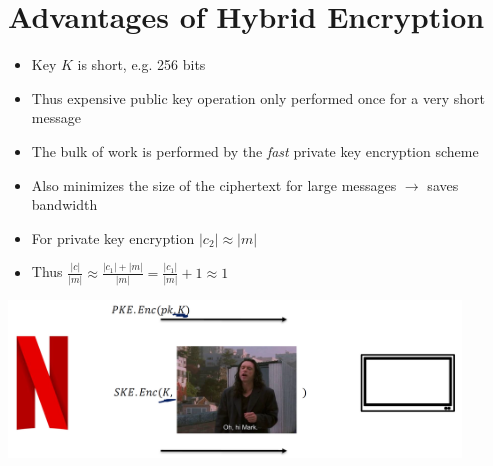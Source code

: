 \section{Advantages of Hybrid Encryption}
	\begin{itemize}
		\item Key $K$ is short, e.g. 256 bits
		\item Thus expensive public key operation only performed once for a very short message
		\item The bulk of work is performed by the \textit{fast} private key encryption scheme
		\item Also minimizes the size of the ciphertext for large messages $\rightarrow$ saves bandwidth
		\item For private key encryption $|c_2| \approx |m|$
		\item Thus $\frac{|c|}{|m|} \approx \frac{|c_1|+|m|}{|m|} = \frac{|c_1|}{|m|} + 1 \approx 1$
	\end{itemize}
	\begin{center}
		\includegraphics[width=120mm]{Graphics/Hybrid Encryption/he2.png}
	\end{center}

